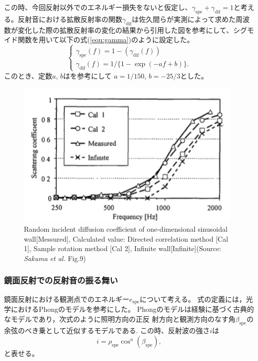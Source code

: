 この時、今回反射以外でのエネルギー損失をないと仮定し、$\gamma_\mathrm{spe} + \gamma_\mathrm{dif} = 1 $と考える。反射音における拡散反射率の関数$\gamma_\mathrm{dif}$は佐久間らが実測によって求めた周波数が変化した際の拡散反射率の変化の結果から引用した図\cite{sakuma2004soundreflection}を参考にして、シグモイド関数を用いて以下の式(\ref{equ:gamma})のように設定した。
\begin{equation}
    \label{equ:gamma}
    \left\{
    \begin{array}{l}
        \gamma_\mathrm{spe}(f) = 1 - (\gamma_\mathrm{dif}(f))\\
        \gamma_\mathrm{dif}(f) = 1/\{1-\exp(-af + b)\} .
    \end{array}
    \right.
\end{equation}
このとき、定数$a$, $b$はを参考にして $a=1/150$, $b=-25/3$とした。

\begin{figure}[t]
  \vspace{1zh}
  \centering
    \includegraphics[width=0.7\linewidth]{images/2_diffuse_reflection_rate.png} 
  \caption{ Random incident diffusion coefficient of one-dimensional sinusoidal wall[Messured], Calculated value: Directed correlation method [Cal 1], Sample rotation method [Cal 2], Infinite wall[Infinite](Source: {\it Sakuma et al.}\cite{sakuma2004soundreflection} Fig.9)}
  \label{fig:diffuse_rate}
\end{figure}

\subsubsection{鏡面反射での反射音の振る舞い\label{spec}}
鏡面反射における観測点でのエネルギー$e_\mathrm{spe}$について考える。
式の定義には，光学におけるPhongのモデル\cite{phong1975specularreflection}を参考にした。
Phongのモデルは経験に基づく古典的なモデルであり，次式のように照明方向の正反
射方向と観測方向のなす角$\beta_\mathrm{spe}$の余弦のべき乗として近似するモデルである.
この時、反射波の強さ$i$は
\begin{equation}
	\label{equ:phong}
	i = \rho_\mathrm{spe}\cos^{n}(\beta_\mathrm{spe}) ,
\end{equation}
と表せる。

